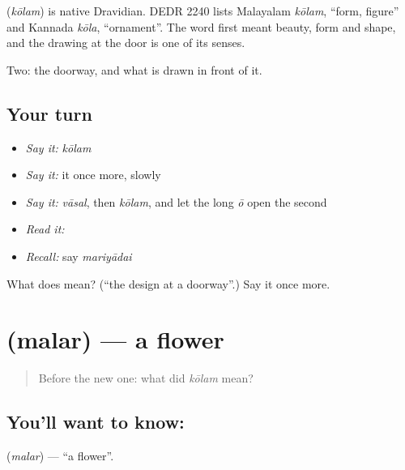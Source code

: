 \begin{cousinweb}
\textbf{} (\emph{kōlam}) is native Dravidian. DEDR 2240 lists Malayalam \emph{kōlam}, \textquotedblleft{}form, figure\textquotedblright{} and Kannada \emph{kōla}, \textquotedblleft{}ornament\textquotedblright{}. The word first meant beauty, form and shape, and the drawing at the door is one of its senses.
\end{cousinweb}

\begin{grammarlens}[title={What you've built}]
Two: the doorway, and what is drawn in front of it.
\end{grammarlens}

\subsection*{Your turn}
\begin{itemize}
\raggedright
  \item \emph{Say it:} \emph{kōlam}
  \item \emph{Say it:} it once more, slowly
  \item \emph{Say it:} \emph{vāsal}, then \emph{kōlam}, and let the long \emph{ō} open the second
  \item \emph{Read it:} \textbf{}
  \item \emph{Recall:} say \emph{mariyādai}
\end{itemize}

\begin{tcolorbox}[breakable,colback=teal!4,colframe=teal!35!black,title={Before you move on}]
What does  mean? (\textquotedblleft{}the design at a doorway\textquotedblright{}.) Say it once more.
\end{tcolorbox}
\section[\texorpdfstring{\ta{மலர்} (malar)}{மலர் (malar)}]{ (malar) — a flower}

\label{lesson:TA-C50-flower}



\begin{quote}
Before the new one: what did \emph{kōlam} mean?
\end{quote}

\subsection*{You'll want to know: }
\textbf{} (\emph{malar}) — \textquotedblleft{}a flower\textquotedblright{}.

